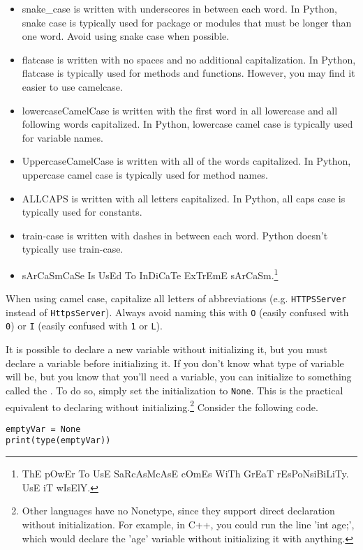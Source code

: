 \begin{itemize}
    \item snake\_case is written with underscores in between each word. In Python, snake case is typically used for package or modules that must be longer than one word. Avoid using snake case when possible.
    \item flatcase is written with no spaces and no additional capitalization. In Python, flatcase is typically used for methods and functions. However, you may find it easier to use camelcase.
    \item lowercaseCamelCase is written with the first word in all lowercase and all following words capitalized. In Python, lowercase camel case is typically used for variable names.
    \item UppercaseCamelCase is written with all of the words capitalized. In Python, uppercase camel case is typically used for method names.
    \item ALLCAPS is written with all letters capitalized. In Python, all caps case is typically used for constants.
    \item train-case is written with dashes in between each word. Python doesn't typically use train-case.
    \item sArCaSmCaSe Is UsEd To InDiCaTe ExTrEmE sArCaSm.\footnote{ThE pOwEr To UsE SaRcAsMcAsE cOmEs WiTh GrEaT rEsPoNsiBiLiTy. UsE iT wIsElY.}
\end{itemize}
When using camel case, capitalize all letters of abbreviations (e.g. \verb|HTTPSServer| instead of \verb|HttpsServer|). Always avoid naming this with \verb|O| (easily confused with \verb|0|) or \verb|I| (easily confused with \verb|1| or \verb|L|). \par
It is possible to declare a new variable without initializing it, but you must declare a variable before initializing it. If you don't know what type of variable will be, but you know that you'll need a variable, you can initialize to something called the . To do so, simply set the initialization to \verb|None|. This is the practical equivalent to declaring without initializing.\footnote{Other languages have no Nonetype, since they support direct declaration without initialization. For example, in C++, you could run the line 'int age;', which would declare the 'age' variable without initializing it with anything.} Consider the following code.\par
\begin{lstlisting}[style=pippython]
emptyVar = None
print(type(emptyVar))
\end{lstlisting}
